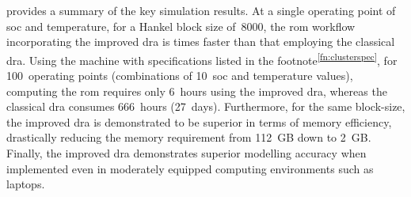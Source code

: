    provides   a   summary   of   the   key   simulation
results.  At  a  single  operating  point  of  \gls{soc}  and  temperature,  for
a  Hankel  block   size  of~8000,  the  \gls{rom}   workflow  incorporating  the
improved  \gls{dra}  is    times  faster  than  that  employing  the
classical   \gls{dra}.  Using   the  machine   with  specifications   listed  in
the  footnote\textsuperscript{\ref{fn:clusterspec}},  for  100~operating  points
(combinations of  10~\gls{soc} and temperature values),  computing the \gls{rom}
requires  only  6~hours using  the  improved  \gls{dra}, whereas  the  classical
\gls{dra} consumes  666~hours (27~days).  Furthermore, for the  same block-size,
the  improved \gls{dra}  is  demonstrated  to be  superior  in  terms of  memory
efficiency,  drastically reducing  the memory  requirement from  112~GB down  to
2~GB. Finally,  the improved \gls{dra} demonstrates  superior modelling accuracy
when  implemented even  in moderately  equipped computing  environments such  as
laptops.

